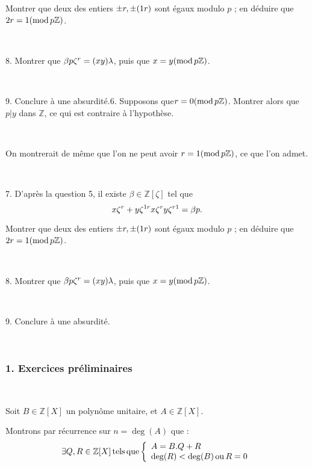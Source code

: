 Montrer que deux des entiers $\pm r, \pm (1 \nonconverted{minus} r)$ sont
{\'e}gaux modulo $p$ ; en d{\'e}duire que $2 r = 1 (\tmop{mod} p\mathbb{Z})$.

\

8. Montrer que $\beta p \zeta^r = (x \nonconverted{minus} y) \lambda$, puis
que $x = y (\tmop{mod} p\mathbb{Z})$.

\

9. Conclure {\`a} une absurdit{\'e}.6. Supposons que$r = 0 (\tmop{mod}
p\mathbb{Z})$. Montrer alors que $p | y$ dans $\mathbb{Z}$, ce qui est
contraire {\`a} l'hypoth{\`e}se.

\

On montrerait de m{\^e}me que l'on ne peut avoir $r = 1 (\tmop{mod}
p\mathbb{Z})$, ce que l'on admet.

\

7. D'apr{\`e}s la question 5, il existe $\beta \in \mathbb{Z}[\zeta]$ tel que
\[ x \zeta^{\nonconverted{minus} r} + y \zeta^{1 \nonconverted{minus} r}
   \nonconverted{minus} x \zeta^r \nonconverted{minus} y \zeta^{r
   \nonconverted{minus} 1} = \beta p. \]


Montrer que deux des entiers $\pm r, \pm (1 \nonconverted{minus} r)$ sont
{\'e}gaux modulo $p$ ; en d{\'e}duire que $2 r = 1 (\tmop{mod} p\mathbb{Z})$.

\

8. Montrer que $\beta p \zeta^r = (x \nonconverted{minus} y) \lambda$, puis
que $x = y (\tmop{mod} p\mathbb{Z})$.

\

9. Conclure {\`a} une absurdit{\'e}.

\

\begin{center}
  {}
\end{center}

\subsubsection*{1. Exercices pr{\'e}liminaires}

\

 Soit $B \in \mathbb{Z} [X]$ un polyn{\^o}me unitaire, et $A \in
\mathbb{Z} [X]$.

Montrons par r{\'e}currence sur $n = \deg (A)$ que :
\[ \exists Q, R \in \mathbb{Z} [X] \tmop{tels} \tmop{que}
   \left\{\begin{array}{l}
     A = B.Q + R\\
     \deg (R) < \deg (B) \tmop{ou} R = 0
   \end{array}\right. \]


